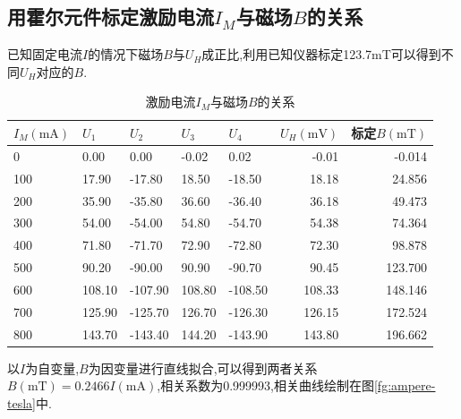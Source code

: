 \documentclass[UTF8,a4paper]{article}%
\begin{document}
\subsection{用霍尔元件标定激励电流$I_M$与磁场$B$的关系}
已知固定电流$I$的情况下磁场$B$与$U_H$成正比,利用已知仪器标定123.7\unit{\milli\tesla}可以得到不同$U_H$对应的$B$.
\begin{table}[H]
    \centering
    \caption{激励电流$I_M$与磁场$B$的关系}
    \begin{tabular}{l|llll|r|r}
        \hline
        $I_M(\unit{\mA})$ & $U_1$  & $U_2$   & $U_3$  & $U_4$   & $U_H(\unit{\mV})$ & 标定$B(\unit{\milli\tesla})$ \\ \hline
        0                 & 0.00   & 0.00    & -0.02  & 0.02    & -0.01             & -0.014                     \\
        100               & 17.90  & -17.80  & 18.50  & -18.50  & 18.18             & 24.856                     \\
        200               & 35.90  & -35.80  & 36.60  & -36.40  & 36.18             & 49.473                     \\
        300               & 54.00  & -54.00  & 54.80  & -54.70  & 54.38             & 74.364                     \\
        400               & 71.80  & -71.70  & 72.90  & -72.80  & 72.30             & 98.878                     \\
        500               & 90.20  & -90.00  & 90.90  & -90.70  & 90.45             & 123.700                    \\
        600               & 108.10 & -107.90 & 108.80 & -108.50 & 108.33            & 148.146                    \\
        700               & 125.90 & -125.70 & 126.70 & -126.30 & 126.15            & 172.524                    \\
        800               & 143.70 & -143.40 & 144.20 & -143.90 & 143.80            & 196.662                    \\ \hline
    \end{tabular}
    \label{tb:im-b}
\end{table}

以$I$为自变量,$B$为因变量进行直线拟合,可以得到两者关系$B(\unit{\milli\tesla})=0.2466I(\unit{\mA})$,相关系数为0.999993,相关曲线绘制在图\ref{fg:ampere-tesla}中.
\end{document}
